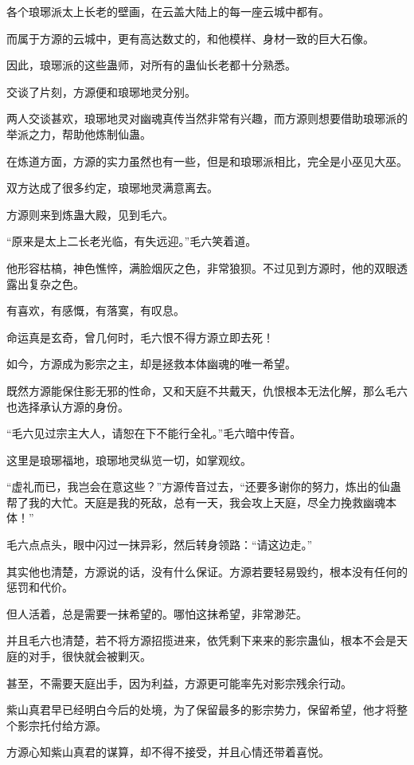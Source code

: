 \begin{this_body}
各个琅琊派太上长老的壁画，在云盖大陆上的每一座云城中都有。

而属于方源的云城中，更有高达数丈的，和他模样、身材一致的巨大石像。

因此，琅琊派的这些蛊师，对所有的蛊仙长老都十分熟悉。

交谈了片刻，方源便和琅琊地灵分别。

两人交谈甚欢，琅琊地灵对幽魂真传当然非常有兴趣，而方源则想要借助琅琊派的举派之力，帮助他炼制仙蛊。

在炼道方面，方源的实力虽然也有一些，但是和琅琊派相比，完全是小巫见大巫。

双方达成了很多约定，琅琊地灵满意离去。

方源则来到炼蛊大殿，见到毛六。

“原来是太上二长老光临，有失远迎。”毛六笑着道。

他形容枯槁，神色憔悴，满脸烟灰之色，非常狼狈。不过见到方源时，他的双眼透露出复杂之色。

有喜欢，有感慨，有落寞，有叹息。

命运真是玄奇，曾几何时，毛六恨不得方源立即去死！

如今，方源成为影宗之主，却是拯救本体幽魂的唯一希望。

既然方源能保住影无邪的性命，又和天庭不共戴天，仇恨根本无法化解，那么毛六也选择承认方源的身份。

“毛六见过宗主大人，请恕在下不能行全礼。”毛六暗中传音。

这里是琅琊福地，琅琊地灵纵览一切，如掌观纹。

“虚礼而已，我岂会在意这些？”方源传音过去，“还要多谢你的努力，炼出的仙蛊帮了我的大忙。天庭是我的死敌，总有一天，我会攻上天庭，尽全力挽救幽魂本体！”

毛六点点头，眼中闪过一抹异彩，然后转身领路：“请这边走。”

其实他也清楚，方源说的话，没有什么保证。方源若要轻易毁约，根本没有任何的惩罚和代价。

但人活着，总是需要一抹希望的。哪怕这抹希望，非常渺茫。

并且毛六也清楚，若不将方源招揽进来，依凭剩下来来的影宗蛊仙，根本不会是天庭的对手，很快就会被剿灭。

甚至，不需要天庭出手，因为利益，方源更可能率先对影宗残余行动。

紫山真君早已经明白今后的处境，为了保留最多的影宗势力，保留希望，他才将整个影宗托付给方源。

方源心知紫山真君的谋算，却不得不接受，并且心情还带着喜悦。


\end{this_body}
